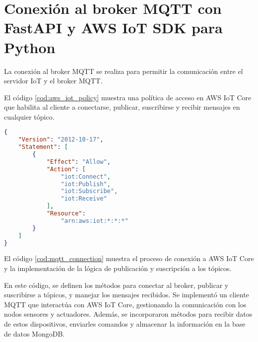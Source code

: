 \chapter{Conexión al broker MQTT con FastAPI y AWS IoT SDK para Python}
\label{AppendixE}

La conexión al broker MQTT se realiza para permitir la comunicación entre el
servidor IoT y el broker MQTT.

El código \ref{cod:aws_iot_policy} muestra una política de acceso en AWS IoT
Core que habilita al cliente a conectarse, publicar, suscribirse y recibir
mensajes en cualquier tópico.

\begin{lstlisting}[label=cod:aws_iot_policy,caption=Ejemplo de política de acceso en AWS IoT Core., language=JSON]
{
    "Version": "2012-10-17",
    "Statement": [
        {
            "Effect": "Allow",
            "Action": [
                "iot:Connect",
                "iot:Publish",
                "iot:Subscribe",
                "iot:Receive"
            ],
            "Resource": 
                "arn:aws:iot:*:*:*"
        }
    ]
}
\end{lstlisting}

El código \ref{cod:mqtt_connection} muestra el proceso de conexión a AWS IoT
Core y la implementación de la lógica de publicación y suscripción a los
tópicos.

En este código, se definen los métodos para conectar al broker, publicar y
suscribirse a tópicos, y manejar los mensajes recibidos. Se implementó un
cliente MQTT que interactúa con AWS IoT Core, gestionando la comunicación con
los nodos sensores y actuadores. Además, se incorporaron métodos para recibir
datos de estos dispositivos, enviarles comandos y almacenar la información en
la base de datos MongoDB.

